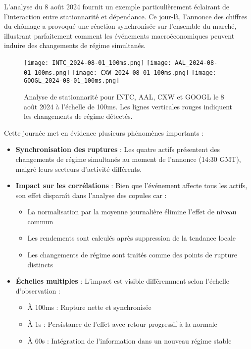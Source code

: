 \documentclass[12pt,a4paper]{article}
\theoremstyle{definition}
\theoremstyle{remark}
\begin{document}
L'analyse du 8 août 2024 fournit un exemple particulièrement éclairant de l'interaction entre stationnarité et dépendance. Ce jour-là, l'annonce des chiffres du chômage a provoqué une réaction synchronisée sur l'ensemble du marché, illustrant parfaitement comment les événements macroéconomiques peuvent induire des changements de régime simultanés.

\begin{figure}[h!]
    \centering
    \texttt{[image: INTC\_2024-08-01\_100ms.png]}
    \texttt{[image: AAL\_2024-08-01\_100ms.png]}
    \texttt{[image: CXW\_2024-08-01\_100ms.png]}
    \texttt{[image: GOOGL\_2024-08-01\_100ms.png]}
    \caption{Analyse de stationnarité pour INTC, AAL, CXW et GOOGL le 8 août 2024 à l'échelle de 100ms. Les lignes verticales rouges indiquent les changements de régime détectés.}
    \label{fig:stationarity_unemployment}
\end{figure}

Cette journée met en évidence plusieurs phénomènes importants :

\begin{itemize}
    \item \textbf{Synchronisation des ruptures} : Les quatre actifs présentent des changements de régime simultanés au moment de l'annonce (14:30 GMT), malgré leurs secteurs d'activité différents.
    
    \item \textbf{Impact sur les corrélations} : Bien que l'événement affecte tous les actifs, son effet disparaît dans l'analyse des copules car :
    \begin{itemize}
        \item La normalisation par la moyenne journalière élimine l'effet de niveau commun
        \item Les rendements sont calculés après suppression de la tendance locale
        \item Les changements de régime sont traités comme des points de rupture distincts
    \end{itemize}
    
    \item \textbf{Échelles multiples} : L'impact est visible différemment selon l'échelle d'observation :
    \begin{itemize}
        \item À 100ms : Rupture nette et synchronisée
        \item À 1s : Persistance de l'effet avec retour progressif à la normale
        \item À 60s : Intégration de l'information dans un nouveau régime stable
    \end{itemize}
\end{itemize}
\end{document}
